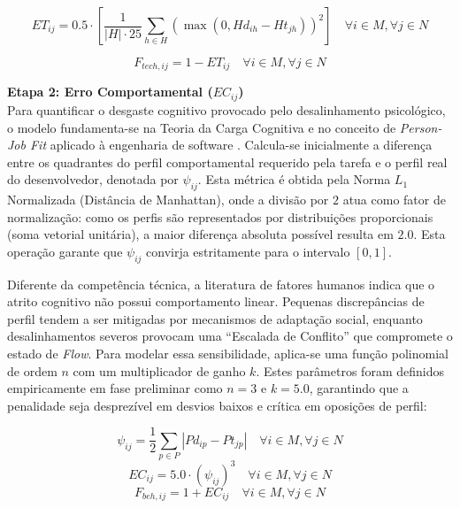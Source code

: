 \documentclass[a4paper,11pt]{article}
\begin{document}
\begin{equation}
    ET_{ij} = 0.5 \cdot \left[ \frac{1}{|H| \cdot 25} \sum_{h \in H} \left(\max(0, Hd_{ih} - Ht_{jh})\right)^2 \right] \quad \forall i \in M, \forall j \in N
\end{equation}

\begin{equation}
    F_{tech, ij} = 1 - ET_{ij} \quad \forall i \in M, \forall j \in N
\end{equation}

\vspace{0.2cm}
\noindent\textbf{Etapa 2: Erro Comportamental ($EC_{ij}$)} \\
Para quantificar o desgaste cognitivo provocado pelo desalinhamento psicológico, o modelo fundamenta-se na Teoria da Carga Cognitiva \citep{sweller1988} e no conceito de \textit{Person-Job Fit} aplicado à engenharia de software \citep{acuna2006, gorla2004}. Calcula-se inicialmente a diferença entre os quadrantes do perfil comportamental requerido pela tarefa e o perfil real do desenvolvedor, denotada por $\psi_{ij}$. Esta métrica é obtida pela Norma $L_1$ Normalizada (Distância de Manhattan), onde a divisão por $2$ atua como fator de normalização: como os perfis são representados por distribuições proporcionais (soma vetorial unitária), a maior diferença absoluta possível resulta em $2.0$. Esta operação garante que $\psi_{ij}$ convirja estritamente para o intervalo $[0, 1]$.

Diferente da competência técnica, a literatura de fatores humanos indica que o atrito cognitivo não possui comportamento linear. Pequenas discrepâncias de perfil tendem a ser mitigadas por mecanismos de adaptação social, enquanto desalinhamentos severos provocam uma ``Escalada de Conflito'' que compromete o estado de \textit{Flow}. Para modelar essa sensibilidade, aplica-se uma função polinomial de ordem $n$ com um multiplicador de ganho $k$. Estes parâmetros foram definidos empiricamente em fase preliminar como $n=3$ e $k=5.0$, garantindo que a penalidade seja desprezível em desvios baixos e crítica em oposições de perfil:

\begin{equation}
    \psi_{ij} = \frac{1}{2} \sum_{p \in P} |Pd_{ip} - Pt_{jp}| \quad \forall i \in M, \forall j \in N
\end{equation}
\begin{equation}
    EC_{ij} = 5.0 \cdot (\psi_{ij})^3 \quad \forall i \in M, \forall j \in N
\end{equation}
\begin{equation}
    F_{beh, ij} = 1 + EC_{ij} \quad \forall i \in M, \forall j \in N
\end{equation}
\end{document}
